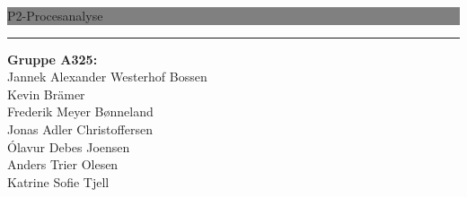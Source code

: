 \newcommand{\HRule}[1]{\hfill \rule{0.2\linewidth}{#1}} 

\thispagestyle{empty} 

\noindent \colorbox{grey}{
	 \parbox[t]{1.0\linewidth}{
		\centering \fontsize{50pt}{80pt}\selectfont
		\vspace*{0.7cm}
		P2-Procesanalyse \\[3pt]
		\vspace*{0.7cm}
	}
}

\vfill
\flushright
\flushright \rule[16pt]{0.1pt}{200pt}  \begin{minipage}[b]{0.45\linewidth}
{
\Large
\textbf{Gruppe A325:} \\[4pt]

Jannek Alexander Westerhof Bossen\\[.2cm]
Kevin Brämer\\[.2cm]
Frederik Meyer Bønneland\\[.2cm]
Jonas Adler Christoffersen\\[.2cm]
Ólavur Debes Joensen\\[.2cm]
Anders Trier Olesen\\[.2cm]
Katrine Sofie Tjell\\[.2cm]

}
\end{minipage}

\clearpage 
